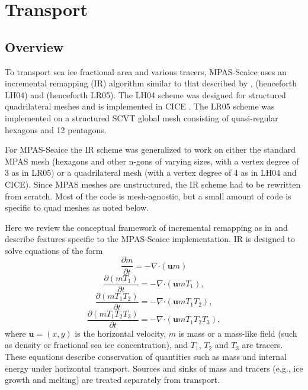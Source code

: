 \section{Transport}
\label{sec:transport}

\label{describe_transport}

\subsection{Overview}

To transport sea ice fractional area and various tracers, MPAS-Seaice uses an incremental remapping (IR) algorithm similar to that described by \citet{Dukowicz00}, \citet{Lipscomb04} (henceforth LH04) and \citet{Lipscomb05} (henceforth LR05). The LH04 scheme was designed for structured quadrilateral meshes and is implemented in CICE \citep{Hunke15}. The LR05 scheme was implemented on a structured SCVT global mesh consisting of quasi-regular hexagons and 12 pentagons.

For MPAS-Seaice the IR scheme was generalized to work on either the standard MPAS mesh (hexagons and other n-gons of varying sizes, with a vertex degree of 3 as in LR05) or a quadrilateral mesh (with a vertex degree of 4 as in LH04 and CICE). Since MPAS meshes are unstructured, the IR scheme had to be rewritten from scratch. Most of the code is mesh-agnostic, but a small amount of code is specific to quad meshes as noted below.

Here we review the conceptual framework of incremental remapping as in \citep{Hunke15} and describe features specific to the MPAS-Seaice implementation. IR is designed to solve equations of the form
\begin{equation}
\label{eq:transport_m}
\frac{\partial m}{\partial t} =-\nabla \boldsymbol{\cdot} (\mathbf{u}m)
\end{equation}
\begin{equation}
\label{eq:transport_T1}
\frac{\partial (m T_1)}{\partial t} = -\nabla \boldsymbol{\cdot} (\mathbf{u} m T_1),
\end{equation}
\begin{equation}
\label{eq:transport_T2}
\frac{\partial (m T_1 T_2)}{\partial t} = -\nabla \boldsymbol{\cdot} (\mathbf{u} m T_1 T_2),
\end{equation}
\begin{equation}
\label{eq:transport_T3}
\frac{\partial (m T_1 T_2 T_3)}{\partial t} = -\nabla \boldsymbol{\cdot} (\mathbf{u} m T_1 T_2 T_3),
\end{equation}
where $\mathbf{u} = (x,y)$ is the horizontal velocity, $m$ is mass or a mass-like field (such as density or fractional sea ice concentration), and $T_1$, $T_2$ and $T_3$ are tracers.  These equations describe conservation of quantities such as mass and internal energy under horizontal transport. Sources and sinks of mass and tracers (e.g., ice growth and melting) are treated separately from transport.  

